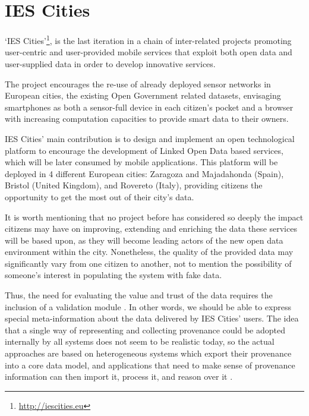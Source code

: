 \section{IES Cities}
\label{sec:ies_cities}

`IES Cities'\footnote{\url{http://iescities.eu}}, is the last iteration in a chain of inter-related projects promoting user-centric and user-provided mobile services that exploit both open data and user-supplied data in order to develop innovative services.

The project encourages the re-use of already deployed sensor networks in European cities, the existing Open Government related datasets, envisaging smartphones as both a sensor-full device in each citizen's pocket and a browser with increasing computation capacities to provide smart data to their owners.

IES Cities' main contribution is to design and implement an open technological platform to encourage the development of Linked Open Data based services, which will be later consumed by mobile applications. This platform will be deployed in 4 different European cities: Zaragoza and Majadahonda (Spain), Bristol (United Kingdom), and Rovereto (Italy), providing citizens the opportunity to get the most out of their city's data.

It is worth mentioning that no project before has considered so deeply the impact citizens may have on improving, extending and enriching the data these services will be based upon, as they will become leading actors of the new open data environment within the city. Nonetheless, the quality of the provided data may significantly vary from one citizen to another, not to mention the possibility of someone's interest in populating the system with fake data.

Thus, the need for evaluating the value and trust of the data requires the inclusion of a validation module \cite{hartig_publishing_2010}. In other words, we should be able to express special meta-information about the data delivered by IES Cities' users. The idea that a single way of representing and collecting provenance could be adopted internally by all systems does not seem to be realistic today, so the actual approaches are based on heterogeneous systems which export their provenance into a core data model, and applications that need to make sense of provenance information can then import it, process it, and reason over it \cite{ceolin_trust_2012}.


